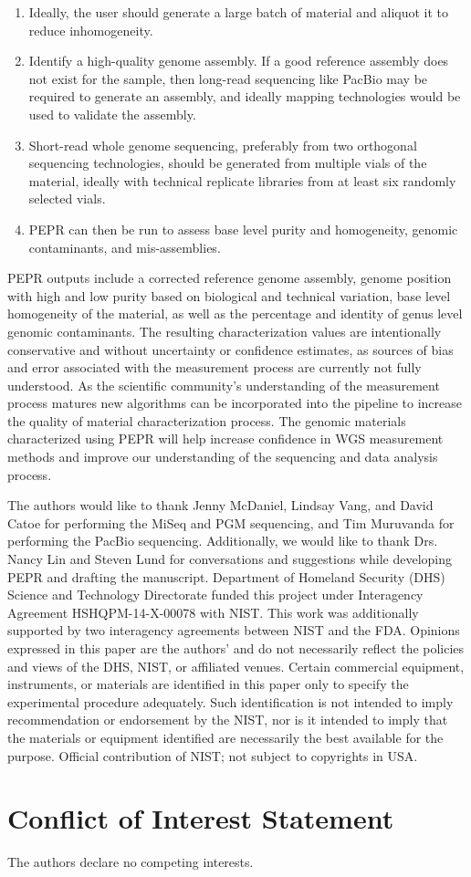 \documentclass[smallextended]{svjour3}\usepackage[]{graphicx}\usepackage[]{color}
\begin{document}
\begin{enumerate}
    \item Ideally, the user should generate a large batch of material and aliquot it to reduce inhomogeneity.
    \item Identify a high-quality genome assembly. If a good reference assembly does not exist for the sample, then long-read sequencing like PacBio may be required to generate an assembly, and ideally mapping technologies would be used to validate the assembly.
    \item Short-read whole genome sequencing, preferably from two orthogonal sequencing technologies, should be generated from multiple vials of the material, ideally with technical replicate libraries from at least six randomly selected vials.
    \item PEPR can then be run to assess base level purity and homogeneity, genomic contaminants, and mis-assemblies.
\end{enumerate}

PEPR outputs include a corrected reference genome assembly, genome position with high and low purity based on biological and technical variation, base level homogeneity of the material, as well as the percentage and identity of genus level genomic contaminants. 
The resulting characterization values are intentionally conservative and without uncertainty or confidence estimates, as sources of bias and error associated with the measurement process are currently not fully understood. 
As the scientific community's understanding of the measurement process matures new algorithms can be incorporated into the pipeline to increase the quality of material characterization process. 
The genomic materials characterized using PEPR will help increase confidence in WGS measurement methods and improve our understanding of the sequencing and data analysis process.


\begin{acknowledgements}
The authors would like to thank Jenny McDaniel, Lindsay Vang, and David Catoe for performing the MiSeq and PGM sequencing, and Tim Muruvanda for performing the PacBio sequencing. 
Additionally, we would like to thank Drs. Nancy Lin and Steven Lund for conversations and suggestions while developing PEPR and drafting the manuscript. 
Department of Homeland Security (DHS) Science and Technology Directorate funded this project under Interagency Agreement HSHQPM-14-X-00078 with NIST. 
This work was additionally supported by two interagency agreements between NIST and the FDA. 
Opinions expressed in this paper are the authors’ and do not necessarily reflect the policies and views of the DHS, NIST, or affiliated venues. 
Certain commercial equipment, instruments, or materials are identified in this paper only to specify the experimental procedure adequately. 
Such identification is not intended to imply recommendation or endorsement by the NIST, nor is it intended to imply that the materials or equipment identified are necessarily the best available for the purpose.
Official contribution of NIST; not subject to copyrights in USA.
\end{acknowledgements}

\section*{Conflict of Interest Statement}
The authors declare no competing interests.




\end{document}
